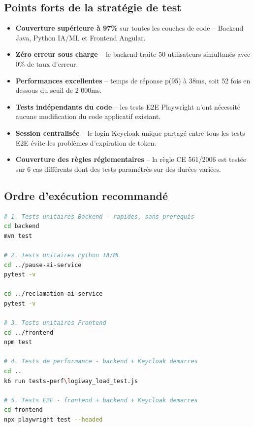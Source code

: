 \documentclass[12pt,a4paper]{report}
\begin{document}
\subsection{Points forts de la stratégie de test}

\begin{itemize}
  \item \textbf{Couverture supérieure à 97\%} sur toutes les couches de
  code -- Backend Java, Python IA/ML et Frontend Angular.
  \item \textbf{Zéro erreur sous charge} -- le backend traite 50
  utilisateurs simultanés avec 0\% de taux d'erreur.
  \item \textbf{Performances excellentes} -- temps de réponse p(95) à
  38ms, soit 52 fois en dessous du seuil de 2 000ms.
  \item \textbf{Tests indépendants du code} -- les tests E2E Playwright
  n'ont nécessité aucune modification du code applicatif existant.
  \item \textbf{Session centralisée} -- le login Keycloak unique partagé
  entre tous les tests E2E évite les problèmes d'expiration de token.
  \item \textbf{Couverture des règles réglementaires} -- la règle CE
  561/2006 est testée sur 6 cas différents dont des tests paramétrés sur
  des durées variées.
\end{itemize}

\subsection{Ordre d'exécution recommandé}

\begin{lstlisting}[language=bash,caption={Ordre d'exécution des tests LogiWay}]
# 1. Tests unitaires Backend - rapides, sans prerequis
cd backend
mvn test

# 2. Tests unitaires Python IA/ML
cd ../pause-ai-service
pytest -v

cd ../reclamation-ai-service
pytest -v

# 3. Tests unitaires Frontend
cd ../frontend
npm test

# 4. Tests de performance - backend + Keycloak demarres
cd ..
k6 run tests-perf\logiway_load_test.js

# 5. Tests E2E - frontend + backend + Keycloak demarres
cd frontend
npx playwright test --headed
\end{lstlisting}

\newpage
\end{document}
